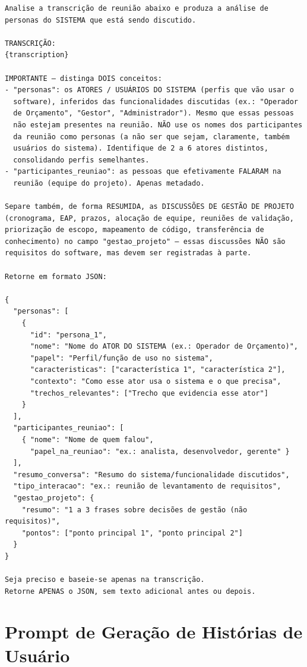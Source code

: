 {\footnotesize
\begin{verbatim}
Analise a transcrição de reunião abaixo e produza a análise de
personas do SISTEMA que está sendo discutido.

TRANSCRIÇÃO:
{transcription}

IMPORTANTE — distinga DOIS conceitos:
- "personas": os ATORES / USUÁRIOS DO SISTEMA (perfis que vão usar o
  software), inferidos das funcionalidades discutidas (ex.: "Operador
  de Orçamento", "Gestor", "Administrador"). Mesmo que essas pessoas
  não estejam presentes na reunião. NÃO use os nomes dos participantes
  da reunião como personas (a não ser que sejam, claramente, também
  usuários do sistema). Identifique de 2 a 6 atores distintos,
  consolidando perfis semelhantes.
- "participantes_reuniao": as pessoas que efetivamente FALARAM na
  reunião (equipe do projeto). Apenas metadado.

Separe também, de forma RESUMIDA, as DISCUSSÕES DE GESTÃO DE PROJETO
(cronograma, EAP, prazos, alocação de equipe, reuniões de validação,
priorização de escopo, mapeamento de código, transferência de
conhecimento) no campo "gestao_projeto" — essas discussões NÃO são
requisitos do software, mas devem ser registradas à parte.

Retorne em formato JSON:

{
  "personas": [
    {
      "id": "persona_1",
      "nome": "Nome do ATOR DO SISTEMA (ex.: Operador de Orçamento)",
      "papel": "Perfil/função de uso no sistema",
      "caracteristicas": ["característica 1", "característica 2"],
      "contexto": "Como esse ator usa o sistema e o que precisa",
      "trechos_relevantes": ["Trecho que evidencia esse ator"]
    }
  ],
  "participantes_reuniao": [
    { "nome": "Nome de quem falou",
      "papel_na_reuniao": "ex.: analista, desenvolvedor, gerente" }
  ],
  "resumo_conversa": "Resumo do sistema/funcionalidade discutidos",
  "tipo_interacao": "ex.: reunião de levantamento de requisitos",
  "gestao_projeto": {
    "resumo": "1 a 3 frases sobre decisões de gestão (não requisitos)",
    "pontos": ["ponto principal 1", "ponto principal 2"]
  }
}

Seja preciso e baseie-se apenas na transcrição.
Retorne APENAS o JSON, sem texto adicional antes ou depois.
\end{verbatim}
}

\section{Prompt de Geração de Histórias de Usuário}


